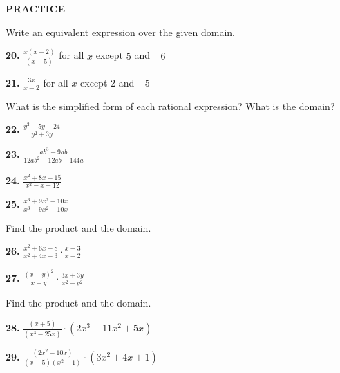 \documentclass{article}
\newenvironment{practice}[2]{\textbf{#1.}}{\vspace{1em}}
\newcommand{\answer}[1]{}
\newcommand{\uncertain}[2]{#1}
\begin{document}
\textbf{PRACTICE}

Write an equivalent expression over the given domain.

\begin{practice}{20}{\uncertain{?}{missing DOK}}
$\frac{x(x-2)}{(x-5)}$ for all $x$ except $5$ and $-6$
\answer{}
\end{practice}

\begin{practice}{21}{\uncertain{?}{missing DOK}}
$\frac{3x}{x-2}$ for all $x$ except $2$ and $-5$
\answer{}
\end{practice}

What is the simplified form of each rational expression? What is the domain?

\begin{practice}{22}{\uncertain{?}{missing DOK}}
$\frac{y^2-5y-24}{y^2+3y}$
\answer{}
\end{practice}

\begin{practice}{23}{\uncertain{?}{missing DOK}}
$\frac{ab^3-9ab}{12ab^2+12ab-144a}$
\answer{}
\end{practice}

\begin{practice}{24}{\uncertain{?}{missing DOK}}
$\frac{x^2+8x+15}{x^2-x-12}$
\answer{}
\end{practice}

\begin{practice}{25}{\uncertain{?}{missing DOK}}
$\frac{x^3+9x^2-10x}{x^3-9x^2-10x}$
\answer{}
\end{practice}

Find the product and the domain.

\begin{practice}{26}{\uncertain{?}{missing DOK}}
$\frac{x^2+6x+8}{x^2+4x+3} \cdot \frac{x+3}{x+2}$
\answer{}
\end{practice}

\begin{practice}{27}{\uncertain{?}{missing DOK}}
$\frac{(x-y)^2}{x+y} \cdot \frac{3x+3y}{x^2-y^2}$
\answer{}
\end{practice}

Find the product and the domain.

\begin{practice}{28}{\uncertain{?}{missing DOK}}
$\frac{(x+5)}{(x^3-25x)} \cdot (2x^3-11x^2+5x)$
\answer{}
\end{practice}

\begin{practice}{29}{\uncertain{?}{missing DOK}}
$\frac{(2x^2-10x)}{(x-5)(x^2-1)} \cdot (3x^2+4x+1)$
\answer{}
\end{practice}
\end{document}

